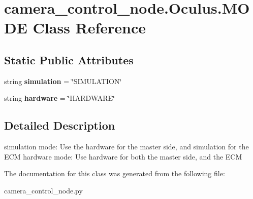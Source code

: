 \hypertarget{classcamera__control__node_1_1Oculus_1_1MODE}{\section{camera\-\_\-control\-\_\-node.\-Oculus.\-M\-O\-D\-E Class Reference}
\label{classcamera__control__node_1_1Oculus_1_1MODE}
}
\subsection*{Static Public Attributes}
\begin{DoxyCompactItemize}
\item 
\hypertarget{classcamera__control__node_1_1Oculus_1_1MODE_aa281148b1bc591561e0532351040b9eb}{string {\bfseries simulation} = \char`\"{}S\-I\-M\-U\-L\-A\-T\-I\-O\-N\char`\"{}}\label{classcamera__control__node_1_1Oculus_1_1MODE_aa281148b1bc591561e0532351040b9eb}

\item 
\hypertarget{classcamera__control__node_1_1Oculus_1_1MODE_a0e3fabf4d205b1ef9e8cd97880d34a07}{string {\bfseries hardware} = \char`\"{}H\-A\-R\-D\-W\-A\-R\-E\char`\"{}}\label{classcamera__control__node_1_1Oculus_1_1MODE_a0e3fabf4d205b1ef9e8cd97880d34a07}

\end{DoxyCompactItemize}


\subsection{Detailed Description}
\begin{DoxyVerb}    simulation mode: Use the hardware for the master side, 
            and simulation for the ECM
    hardware mode: Use hardware for both the master side,
            and the ECM
\end{DoxyVerb}
 

The documentation for this class was generated from the following file\-:\begin{DoxyCompactItemize}
\item 
camera\-\_\-control\-\_\-node.\-py\end{DoxyCompactItemize}
